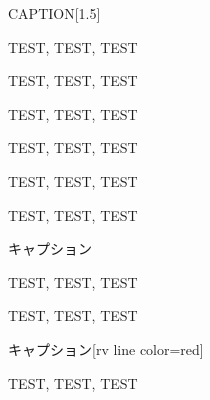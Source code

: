 \begin{simplesquarebox}{CAPTION}[1.5]

TEST, TEST, TEST

\end{simplesquarebox}



\begin{reviewnote}

TEST, TEST, TEST

\end{reviewnote}

\begin{reviewnote}[CAPTION]

TEST, TEST, TEST

\end{reviewnote}

\begin{reviewcaution}[CAPTION]

TEST, TEST, TEST

\end{reviewcaution}

\begin{reviewcaution}

TEST, TEST, TEST

\end{reviewcaution}

\begin{reviewnote}[CAPTION]

TEST, TEST, TEST

\end{reviewnote}

\begin{rv@ascolorbox1@caption}{キャプション}

TEST, TEST, TEST

\end{rv@ascolorbox1@caption}

\begin{rv@ascolorbox1@nocaption}

TEST, TEST, TEST

\end{rv@ascolorbox1@nocaption}

\begin{rv@ascolorbox2@caption}{キャプション}[rv line color=red]

TEST, TEST, TEST

\end{rv@ascolorbox2@caption}

